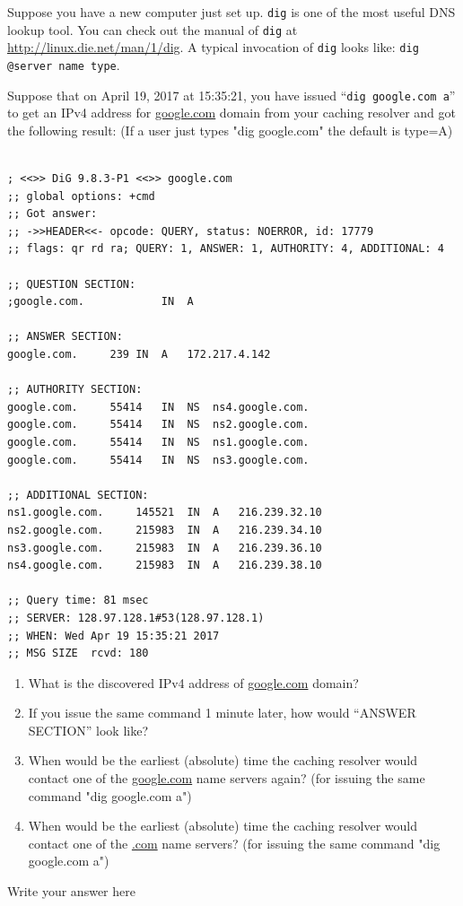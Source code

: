 \documentclass{report}
\begin{document}
\mktitle


\begin{problem}

Suppose you have a new computer just set up. \verb|dig| is one of the most useful DNS lookup tool.
You can check out the manual of \verb|dig| at \url{http://linux.die.net/man/1/dig}.
A typical invocation of \verb|dig| looks like:
\verb|dig @server name type|.

Suppose that on April 19, 2017 at 15:35:21, you have issued ``\verb|dig google.com a|'' to get an IPv4 address for \url{google.com} domain from your caching resolver and got the following result:
(If a user just types "dig google.com" the default is type=A)

\begin{lstlisting}

; <<>> DiG 9.8.3-P1 <<>> google.com
;; global options: +cmd
;; Got answer:
;; ->>HEADER<<- opcode: QUERY, status: NOERROR, id: 17779
;; flags: qr rd ra; QUERY: 1, ANSWER: 1, AUTHORITY: 4, ADDITIONAL: 4

;; QUESTION SECTION:
;google.com.			IN	A

;; ANSWER SECTION:
google.com.		239	IN	A	172.217.4.142

;; AUTHORITY SECTION:
google.com.		55414	IN	NS	ns4.google.com.
google.com.		55414	IN	NS	ns2.google.com.
google.com.		55414	IN	NS	ns1.google.com.
google.com.		55414	IN	NS	ns3.google.com.

;; ADDITIONAL SECTION:
ns1.google.com.		145521	IN	A	216.239.32.10
ns2.google.com.		215983	IN	A	216.239.34.10
ns3.google.com.		215983	IN	A	216.239.36.10
ns4.google.com.		215983	IN	A	216.239.38.10

;; Query time: 81 msec
;; SERVER: 128.97.128.1#53(128.97.128.1)
;; WHEN: Wed Apr 19 15:35:21 2017
;; MSG SIZE  rcvd: 180

\end{lstlisting}

\begin{enumerate}

\item What is the discovered IPv4 address of \url{google.com} domain?

\item If you issue the same command 1 minute later, how would ``ANSWER SECTION'' look like?

\item When would be the earliest (absolute) time the caching resolver would contact one of the \url{google.com} name servers again? (for issuing the same  command "dig  google.com a")

\item When would be the earliest (absolute) time the caching resolver would contact one of the \url{.com} name servers? (for issuing the same  command "dig  google.com a")

\end{enumerate}


\begin{answer}{50em}
    Write your answer here

\end{answer}

\end{problem}
\end{document}
